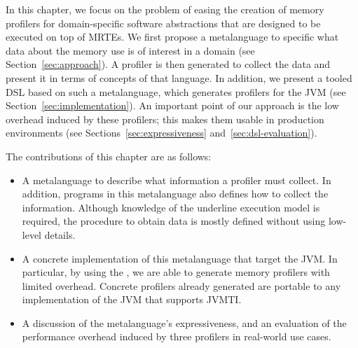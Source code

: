 In this chapter, we focus on the problem of easing the creation of memory profilers for domain-specific software abstractions that are designed to be executed on top of MRTEs. 
We first propose a metalanguage to specific what data about the memory use is of interest in a domain (see Section~\ref{sec:approach}).
A profiler is then generated to collect the data and present it in terms of concepts of that language. 
In addition, we present a tooled DSL based on such a metalanguage, which generates profilers for the JVM (see Section~\ref{sec:implementation}).
An important point of our approach is the low overhead induced by these profilers; this makes them usable in production environments (see Sections~\ref{sec:expressiveness} and~\ref{sec:dsl-evaluation}).

The contributions of this chapter are as follows:
\begin{itemize}
\item A metalanguage to describe what information a profiler must collect.
In addition, programs in this metalanguage also defines how to collect the information.
Although knowledge of the underline execution model is required, the procedure to obtain data is mostly defined without using low-level details.  

\item A concrete implementation of this metalanguage that target the JVM.
In particular, by using the , we are able to generate memory profilers with limited overhead.
Concrete profilers already generated are portable to any implementation of the JVM that supports JVMTI.

\item A discussion of the metalanguage's expressiveness, and an evaluation of the performance overhead induced by three profilers in real-world use cases.
\end{itemize}

